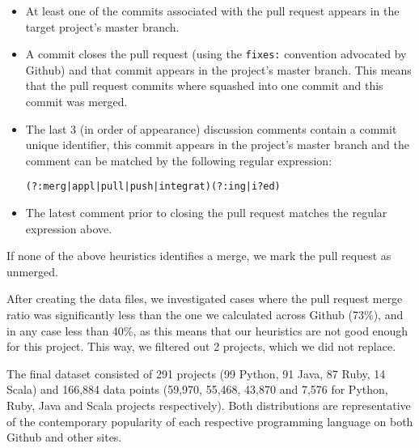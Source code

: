 \documentclass{sig-alternate}
\begin{document}
\begin{itemize}

  \item At least one of the commits associated with the pull request appears in
    the target project's master branch. 

  \item A commit closes the pull request (using the \texttt{fixes:} convention
    advocated by Github) and that commit appears in the project's master branch.
    This means that the pull request commits where squashed into one commit and
    this commit was merged.

  \item The last 3 (in order of appearance) discussion comments contain
    a commit unique identifier, this commit appears in the
    project's master branch and the comment can be matched by the following 
    regular expression:

    \begin{small}
    \texttt{(?:merg|appl|pull|push|integrat)(?:ing|i?ed)}
    \end{small}
  \item The latest comment prior to closing the pull request matches the 
    regular expression above.

\end{itemize}

If none of the above heuristics identifies a merge, we mark the pull request
as unmerged. 

After creating the data files, we investigated cases where the pull request
merge ratio was significantly less than the one we calculated across Github
(73\%), and in any case less than 40\%, as this means that our heuristics are not
good enough for this project. This way, we filtered out 2 projects, which we did not
replace.

The final dataset consisted of 291 projects (99 Python, 91 Java, 87 Ruby, 14
Scala) and 166,884 data points (59,970, 55,468, 43,870 and 7,576 for Python,
Ruby, Java and Scala projects respectively). Both distributions are
representative of the contemporary popularity of each respective programming
language on both Github and other sites.

%
\end{document}
